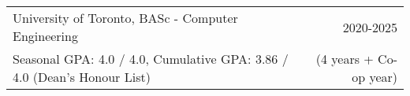 \begin{tabularx}{\textwidth}{ @{}X r@{} }
    University of Toronto, BASc - Computer Engineering & 2020-2025 \\
    Seasonal GPA: 4.0 / 4.0, Cumulative GPA: 3.86 / 4.0 (Dean’s Honour List) & (4 years + Co-op year) \\
\end{tabularx}